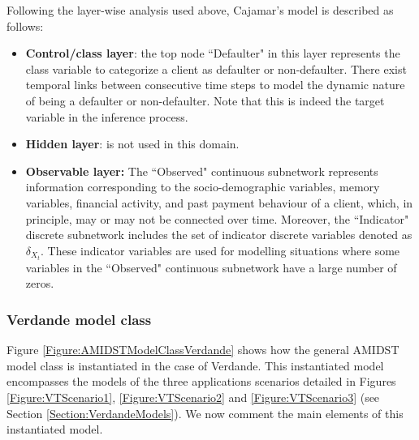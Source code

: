 Following the layer-wise analysis used above, Cajamar's model is described as follows:
\begin{itemize}

\item \textbf{Control/class layer}: the top node ``Defaulter" in this layer represents the class variable to categorize a client as defaulter or non-defaulter. There exist temporal links between consecutive time steps to model the dynamic nature of being a defaulter or non-defaulter. Note that this is indeed the target variable in the inference process.

\item \textbf{Hidden layer}: is not used in this domain.

\item \textbf{Observable layer:} The ``Observed" continuous subnetwork represents information corresponding to the socio-demographic variables, memory variables, financial activity, and past payment behaviour of a client, which, in principle, may or may not be connected over time. Moreover, the ``Indicator" discrete subnetwork includes the set of indicator discrete variables denoted as $\delta_{X_t}$. These indicator variables are used for modelling situations where some variables in the ``Observed" continuous subnetwork have a large number of zeros.

\end{itemize}



\subsubsection{Verdande model class}\label{verdandeAMIDSTModels}

Figure \ref{Figure:AMIDSTModelClassVerdande} shows how the general AMIDST model class is instantiated in the case of Verdande. This instantiated model encompasses the models of the three applications scenarios detailed in Figures \ref{Figure:VTScenario1}, \ref{Figure:VTScenario2} and \ref{Figure:VTScenario3}  (see Section \ref{Section:VerdandeModels}).  We now comment the main elements of this instantiated model.



